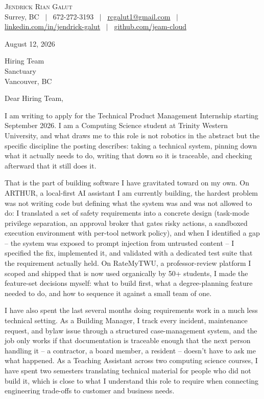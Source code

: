 \documentclass[letterpaper,11pt]{article}
\begin{document}
\begin{center}
    {\LARGE \scshape Jendrick Rian Galut} \\ \vspace{2pt}
    \small Surrey, BC ~$|$~
    672-272-3193 ~$|$~
    \href{mailto:rcgalut1@gmail.com}{\underline{rcgalut1@gmail.com}} ~$|$~
    \href{https://www.linkedin.com/in/jendrick-rian-galut-374310307/}{\underline{linkedin.com/in/jendrick-galut}} ~$|$~
    \href{https://github.com/Jeam-cloud}{\underline{github.com/jeam-cloud}}
\end{center}

\vspace{8pt}

August 12, 2026

Hiring Team \\
Sanctuary \\
Vancouver, BC

Dear Hiring Team,

I am writing to apply for the Technical Product Management Internship starting September 2026. I am a Computing Science student at Trinity Western University, and what draws me to this role is not robotics in the abstract but the specific discipline the posting describes: taking a technical system, pinning down what it actually needs to do, writing that down so it is traceable, and checking afterward that it still does it.

That is the part of building software I have gravitated toward on my own. On ARTHUR, a local-first AI assistant I am currently building, the hardest problem was not writing code but defining what the system was and was not allowed to do: I translated a set of safety requirements into a concrete design (task-mode privilege separation, an approval broker that gates risky actions, a sandboxed execution environment with per-tool network policy), and when I identified a gap -- the system was exposed to prompt injection from untrusted content -- I specified the fix, implemented it, and validated with a dedicated test suite that the requirement actually held. On RateMyTWU, a professor-review platform I scoped and shipped that is now used organically by 50+ students, I made the feature-set decisions myself: what to build first, what a degree-planning feature needed to do, and how to sequence it against a small team of one.

I have also spent the last several months doing requirements work in a much less technical setting. As a Building Manager, I track every incident, maintenance request, and bylaw issue through a structured case-management system, and the job only works if that documentation is traceable enough that the next person handling it -- a contractor, a board member, a resident -- doesn't have to ask me what happened. As a Teaching Assistant across two computing science courses, I have spent two semesters translating technical material for people who did not build it, which is close to what I understand this role to require when connecting engineering trade-offs to customer and business needs.
\end{document}
